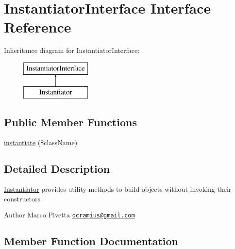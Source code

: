 \hypertarget{interface_doctrine_1_1_instantiator_1_1_instantiator_interface}{}\section{Instantiator\+Interface Interface Reference}
\label{interface_doctrine_1_1_instantiator_1_1_instantiator_interface}
Inheritance diagram for Instantiator\+Interface\+:\begin{figure}[H]
\begin{center}
\leavevmode
\includegraphics[height=2.000000cm]{interface_doctrine_1_1_instantiator_1_1_instantiator_interface}
\end{center}
\end{figure}
\subsection*{Public Member Functions}
\begin{DoxyCompactItemize}
\item 
\mbox{\hyperlink{interface_doctrine_1_1_instantiator_1_1_instantiator_interface_a6d0d1226a8effb59e4b94606195c33ac}{instantiate}} (\$class\+Name)
\end{DoxyCompactItemize}


\subsection{Detailed Description}
\mbox{\hyperlink{class_doctrine_1_1_instantiator_1_1_instantiator}{Instantiator}} provides utility methods to build objects without invoking their constructors

\begin{DoxyAuthor}{Author}
Marco Pivetta \href{mailto:ocramius@gmail.com}{\tt ocramius@gmail.\+com} 
\end{DoxyAuthor}


\subsection{Member Function Documentation}
\mbox{\label{interface_doctrine_1_1_instantiator_1_1_instantiator_interface_a6d0d1226a8effb59e4b94606195c33ac}} 
